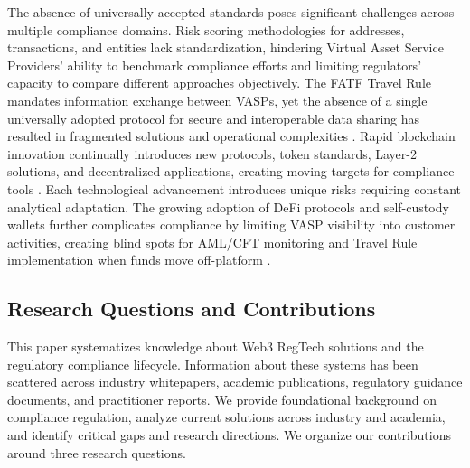 The absence of universally accepted standards poses significant challenges across multiple compliance domains. Risk scoring methodologies for addresses, transactions, and entities lack standardization, hindering Virtual Asset Service Providers' ability to benchmark compliance efforts and limiting regulators' capacity to compare different approaches objectively. The FATF Travel Rule mandates information exchange between VASPs, yet the absence of a single universally adopted protocol for secure and interoperable data sharing has resulted in fragmented solutions and operational complexities \cite{force2021updatedguidanceriskbased,pocher2022privacytransparencycbdcs}. Rapid blockchain innovation continually introduces new protocols, token standards, Layer-2 solutions, and decentralized applications, creating moving targets for compliance tools \cite{mohammedabdul2024navigatingblockchainstwin,xu2024exploringblockchaintechnology,bankforinternationalsettlementsbis2022futuremonetarysystem}. Each technological advancement introduces unique risks requiring constant analytical adaptation. The growing adoption of DeFi protocols and self-custody wallets further complicates compliance by limiting VASP visibility into customer activities, creating blind spots for AML/CFT monitoring and Travel Rule implementation when funds move off-platform \cite{harvey2021defifuturefinance,salami2021challengesapproachesregulating}.

\subsection{Research Questions and Contributions}

This paper systematizes knowledge about Web3 RegTech solutions and the regulatory compliance lifecycle. Information about these systems has been scattered across industry whitepapers, academic publications, regulatory guidance documents, and practitioner reports. We provide foundational background on compliance regulation, analyze current solutions across industry and academia, and identify critical gaps and research directions. We organize our contributions around three research questions.

